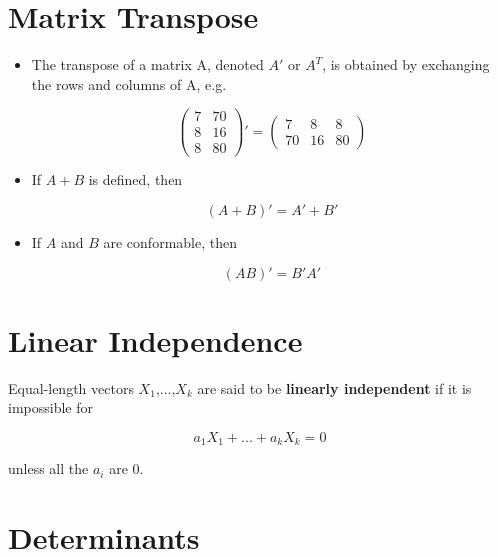 \section{Matrix Transpose}

\begin{itemize}

\item The transpose of a matrix A, denoted $A'$ or $A^{T}$, is obtained by
exchanging the rows and columns of A, e.g.

\begin{equation}
\left (
\begin{array}{cc}
7 & 70 \\
8 & 16 \\
8 & 80
\end{array}
\right )' =
\left (
\begin{array}{ccc}
7 & 8 & 8 \\
70 & 16 & 80
\end{array}
\right )
\end{equation}

\item If $A + B$ is defined, then

\begin{equation}
(A+B)' = A' + B'
\end{equation}

\item If $A$ and $B$ are conformable, then

\begin{equation}
(AB)' = B'A'
\end{equation}

\end{itemize}

\section{Linear Independence}

Equal-length vectors $X_1$,...,$X_k$ are said to be {\bf linearly
independent} if it is impossible for

\begin{equation}
a_1 X_1 +
... +
a_k X_k = 0
\end{equation}

unless all the $a_i$ are 0.

\section{Determinants}

